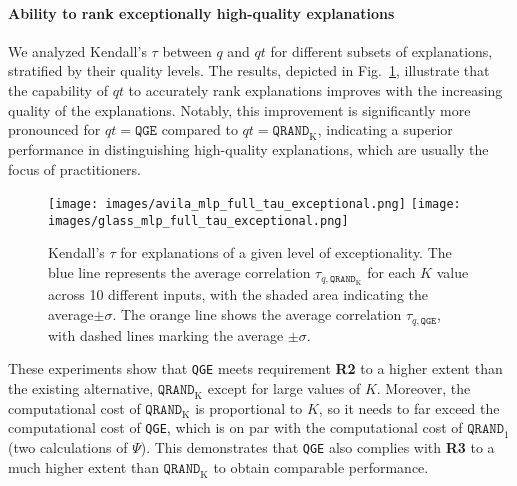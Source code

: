 
\paragraph{Ability to rank exceptionally high-quality explanations}

We analyzed Kendall's $\tau$ between $q$ and $qt$ for different subsets of explanations, stratified by their quality levels. The results, depicted in Fig.~\ref{fig:exhaustive_tau_exceptional}, illustrate that the capability of $qt$ to accurately rank explanations improves with the increasing quality of the explanations. Notably, this improvement is significantly more pronounced for $qt=\texttt{QGE}$ compared to $qt=\texttt{QRAND}_{\text{K}}$, indicating a superior performance in distinguishing high-quality explanations, which are usually the focus of practitioners.

\begin{figure}[htbp]
    \centering
    \texttt{[image: images/avila\_mlp\_full\_tau\_exceptional.png]}
    \texttt{[image: images/glass\_mlp\_full\_tau\_exceptional.png]}
    \caption{Kendall's $\tau$ for explanations of a given level of exceptionality. The blue line represents the average correlation $\tau_{q,\texttt{QRAND}_{\text{K}}}$ for each $K$ value across 10 different inputs, with the shaded area indicating the average$\pm\sigma$. The orange line shows the average correlation $\tau_{q,\texttt{QGE}}$,  with dashed lines marking the average $\pm\sigma$.}
    \label{fig:exhaustive_tau_exceptional}
\end{figure}

These experiments show that \texttt{QGE} meets requirement \textbf{R2} to a higher extent than the existing alternative, $\texttt{QRAND}_{\text{K}}$ except for large values of $K$. Moreover, the computational cost of $\texttt{QRAND}_{\text{K}}$ is proportional to $K$, so it needs to far exceed the computational cost of \texttt{QGE}, which is on par with the computational cost of $\texttt{QRAND}_1$ (two calculations of $\Psi$). This demonstrates that \texttt{QGE} also complies with \textbf{R3} to a much higher extent than $\texttt{QRAND}_{\text{K}}$ to obtain comparable performance.

